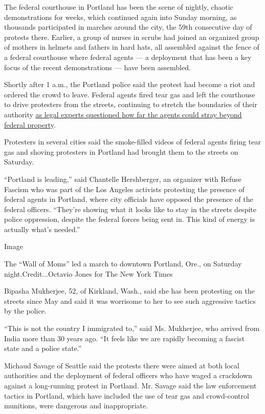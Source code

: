 The federal courthouse in Portland has been the scene of nightly,
chaotic demonstrations for weeks, which continued again into Sunday
morning, as thousands participated in marches around the city, the 59th
consecutive day of protests there. Earlier, a group of nurses in scrubs
had joined an organized group of mothers in helmets and fathers in hard
hats, all assembled against the fence of a federal courthouse where
federal agents --- a deployment that has been a key focus of the recent
demonstrations --- have been assembled.

Shortly after 1 a.m., the Portland police said the protest had become a
riot and ordered the crowd to leave. Federal agents fired tear gas and
left the courthouse to drive protesters from the streets, continuing to
stretch the boundaries of their authority
\href{https://www.nytimes3xbfgragh.onion/2020/07/25/us/portland-federal-legal-jurisdiction-courts.html}{as
legal experts questioned how far the agents could stray beyond federal
property}.

Protesters in several cities said the smoke-filled videos of federal
agents firing tear gas and shoving protesters in Portland had brought
them to the streets on Saturday.

``Portland is leading,'' said Chantelle Hershberger, an organizer with
Refuse Fascism who was part of the Los Angeles activists protesting the
presence of federal agents in Portland, where city officials have
opposed the presence of the federal officers. ``They're showing what it
looks like to stay in the streets despite police oppression, despite the
federal forces being sent in. This kind of energy is actually what's
needed.''

Image

The ``Wall of Moms'' led a march to downtown Portland, Ore., on Saturday
night.Credit...Octavio Jones for The New York Times

Bipasha Mukherjee, 52, of Kirkland, Wash., said she has been protesting
on the streets since May and said it was worrisome to her to see such
aggressive tactics by the police.

``This is not the country I immigrated to,'' said Ms. Mukherjee, who
arrived from India more than 30 years ago. ``It feels like we are
rapidly becoming a fascist state and a police state.''

Michaud Savage of Seattle said the protests there were aimed at both
local authorities and the deployment of federal officers who have waged
a crackdown against a long-running protest in Portland. Mr. Savage said
the law enforcement tactics in Portland, which have included the use of
tear gas and crowd-control munitions, were dangerous and inappropriate.

